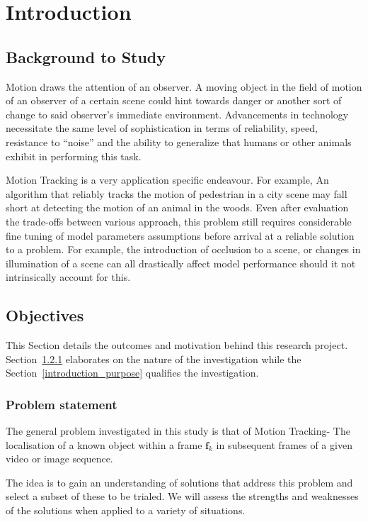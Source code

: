 \chapter{Introduction}\label{chapter_introduction}

\section{Background to Study}
Motion draws the attention of an observer. A moving object in the field of
motion of an observer of a certain scene could hint towards danger or another
sort of change to said observer's immediate environment. Advancements in
technology necessitate the same level of sophistication in terms of
reliability, speed, resistance to ``noise'' and the ability to generalize that
humans or other animals exhibit in performing this task.

Motion Tracking is a very application specific endeavour. For example, An
algorithm that reliably tracks the motion of pedestrian in a city scene may fall
short at detecting the motion of an animal in the woods. Even after evaluation
the trade-offs between various approach, this problem still requires
considerable fine tuning of model parameters assumptions before arrival at a
reliable solution to a problem.  For example, the introduction of occlusion to a
scene, or changes in illumination of a scene can all drastically affect model
performance should it not intrinsically account for this.

\section{Objectives}\label{introduction_objectives}
This Section details the outcomes and motivation behind this research project.
Section~\ref{introduction_problem} elaborates on the nature of the investigation
while the Section~\ref{introduction_purpose} qualifies the investigation.

\subsection{Problem statement}\label{introduction_problem}
The general problem investigated in this study is that of Motion Tracking- The
localisation of a known object within a frame $\mathbf{f}_k$ in subsequent
frames of a given video or image sequence.  

The idea is to gain an understanding of solutions that address this problem and
select a subset of these to be trialed. We will assess the strengths and
weaknesses of the solutions when applied to a variety of situations.

